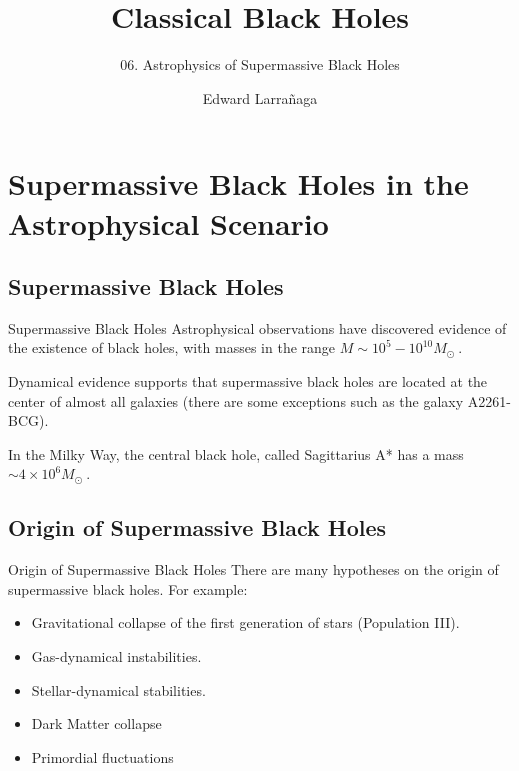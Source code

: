 \documentclass{beamer}
\title{Classical Black Holes} %
\subtitle{06. Astrophysics of Supermassive Black Holes} %
\author{Edward Larra\~{n}aga}
\begin{document}
\frame{\maketitle}


\section{Supermassive Black Holes in the Astrophysical Scenario}

\subsection{Supermassive Black Holes}
\begin{frame}{Supermassive Black Holes}
	Astrophysical observations have discovered evidence of the existence of black holes, with masses in the range $M \sim 10^5 - 10^{10} M_\odot\ $.\\
	\bigskip
	\pause

	Dynamical evidence supports that supermassive black holes are located at the center of almost all galaxies (there are some exceptions such as the galaxy A2261-BCG).
	\bigskip
	\pause
	
	In the Milky Way, the central black hole, called Sagittarius A* has a mass $\sim 4 \times 10^6 M_\odot\ $.
\end{frame}

\subsection{Origin of Supermassive Black Holes}
\begin{frame}{Origin of Supermassive Black Holes}
	There are many hypotheses on the origin of supermassive black holes. For example:
	\begin{itemize}
    \item<2-> Gravitational collapse of the first generation of stars (Population III).
    \item<3-> Gas-dynamical instabilities.
	\item<4-> Stellar-dynamical stabilities.
	\item<5-> Dark Matter collapse
	\item<6-> Primordial fluctuations
    \end{itemize}
\end{frame}
\end{document}
